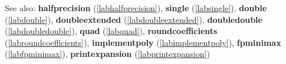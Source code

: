 See also: \textbf{halfprecision} (\ref{labhalfprecision}), \textbf{single} (\ref{labsingle}), \textbf{double} (\ref{labdouble}), \textbf{doubleextended} (\ref{labdoubleextended}), \textbf{doubledouble} (\ref{labdoubledouble}), \textbf{quad} (\ref{labquad}), \textbf{roundcoefficients} (\ref{labroundcoefficients}), \textbf{implementpoly} (\ref{labimplementpoly}), \textbf{fpminimax} (\ref{labfpminimax}), \textbf{printexpansion} (\ref{labprintexpansion})
